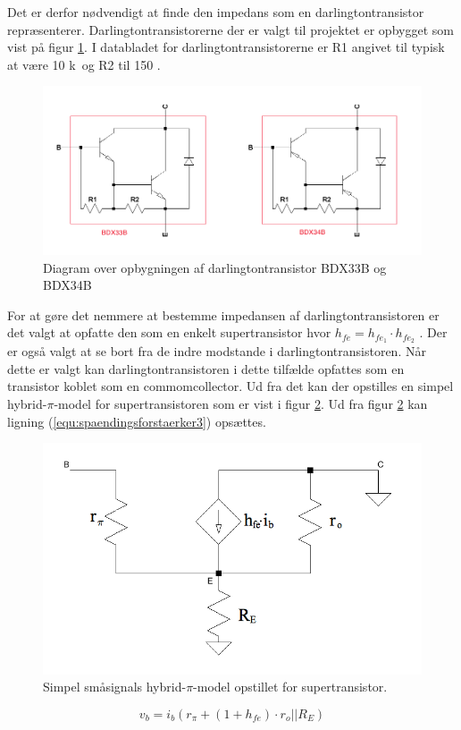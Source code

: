 Det er derfor nødvendigt at finde den impedans som en darlingtontransistor  repræsenterer. Darlingtontransistorerne der er valgt til projektet er opbygget som vist på figur \ref{darlington_diagram}. I databladet for darlingtontransistorerne \cite{bdx33-34-datablad} er R1 angivet til typisk at være 10 k\ohm~og R2 til 150 \ohm.

\begin{figure}[h]
\centering
\includegraphics[scale = 0.4]{teknisk/effektforstaerker/darlingtontransistor_opbygning.png}
\caption{Diagram over opbygningen af darlingtontransistor BDX33B og BDX34B}
\label{darlington_diagram}
\end{figure}

For at gøre det nemmere at bestemme impedansen af darlingtontransistoren er det valgt at opfatte den som en enkelt supertransistor hvor $h_{fe}= h_{fe_1} \cdot h_{fe_2}$ \cite{sedra-smith}. %
Der er også valgt at se bort fra de indre modstande i darlingtontransistoren. Når dette er valgt kan darlingtontransistoren i dette tilfælde opfattes som en transistor koblet som en commomcollector. Ud fra det kan der opstilles en simpel hybrid-$\pi$-model for supertransistoren som er vist i figur \ref{hybridpimodel_darlington}. Ud fra figur \ref{hybridpimodel_darlington} kan ligning (\ref{equ:spaendingsforstaerker3}) opsættes.

\begin{figure}[h]
\centering
\includegraphics[scale=0.3]{teknisk/effektforstaerker/hybridpimodel.png}
\caption{Simpel småsignals hybrid-$\pi$-model  opstillet for supertransistor.}
\label{hybridpimodel_darlington}
\end{figure}
\begin{equation}
\label{equ:spaendingsforstaerker3}
v_b = i_b (r_{\pi} + (1+h_{fe}) \cdot r_o||R_E) 
\end{equation}

